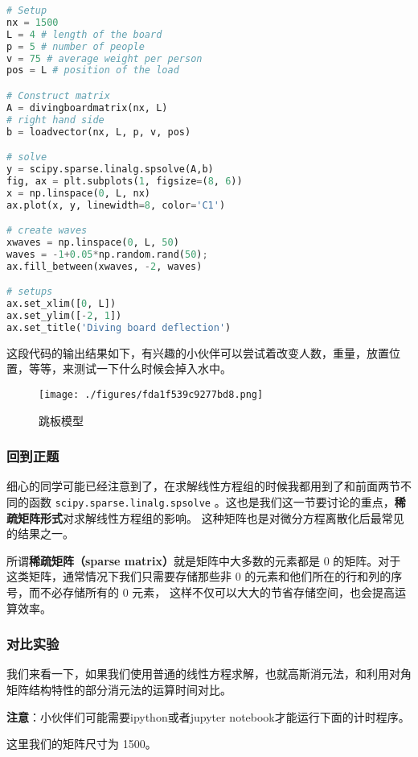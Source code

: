 \begin{lstlisting}[language=python]
# Setup
nx = 1500
L = 4 # length of the board
p = 5 # number of people
v = 75 # average weight per person
pos = L # position of the load

# Construct matrix
A = divingboardmatrix(nx, L)
# right hand side
b = loadvector(nx, L, p, v, pos)

# solve
y = scipy.sparse.linalg.spsolve(A,b)
fig, ax = plt.subplots(1, figsize=(8, 6))
x = np.linspace(0, L, nx)
ax.plot(x, y, linewidth=8, color='C1')

# create waves
xwaves = np.linspace(0, L, 50)
waves = -1+0.05*np.random.rand(50);  
ax.fill_between(xwaves, -2, waves)

# setups
ax.set_xlim([0, L])
ax.set_ylim([-2, 1])
ax.set_title('Diving board deflection')
\end{lstlisting}
这段代码的输出结果如下，有兴趣的小伙伴可以尝试着改变人数，重量，放置位置，等等，来测试一下什么时候会掉入水中。

\begin{figure}[ht]
\centering
\texttt{[image: ./figures/fda1f539c9277bd8.png]}
\caption{跳板模型} \label{fig_NLinE3_2}
\end{figure}

\subsubsection{回到正题}

细心的同学可能已经注意到了，在求解线性方程组的时候我都用到了和前面两节不同的函数 \verb|scipy.sparse.linalg.spsolve| 。这也是我们这一节要讨论的重点，\textbf{稀疏矩阵形式}对求解线性方程组的影响。 这种矩阵也是对微分方程离散化后最常见的结果之一。

所谓\textbf{稀疏矩阵（sparse matrix）}就是矩阵中大多数的元素都是 0 的矩阵。对于这类矩阵，通常情况下我们只需要存储那些非 0 的元素和他们所在的行和列的序号，而不必存储所有的 0 元素， 这样不仅可以大大的节省存储空间，也会提高运算效率。

\subsubsection{对比实验}

我们来看一下，如果我们使用普通的线性方程求解，也就高斯消元法，和利用对角矩阵结构特性的部分消元法的运算时间对比。

\textbf{注意}：小伙伴们可能需要ipython或者jupyter notebook才能运行下面的计时程序。

这里我们的矩阵尺寸为 1500。

